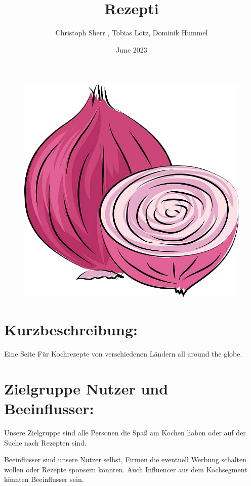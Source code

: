 \documentclass{article}
\title{Rezepti}
\author{ Christoph Sherr , Tobias Lotz, Dominik Hummel }
\date{June 2023}
\begin{document}
\begin{figure}
    \centering
    \includegraphics[scale=0.3]{Pictures/rezepti.png}
    \label{fig:sfig1}
\end{figure}
\maketitle

\pagebreak
\section{Kurzbeschreibung:}
Eine Seite Für Kochrezepte von verschiedenen Ländern all around the globe.

\section{Zielgruppe Nutzer und Beeinflusser:}
Unsere Zielgruppe sind alle Personen die Spaß am Kochen haben oder auf der Suche nach Rezepten sind.

Beeinflusser sind unsere Nutzer selbst, Firmen die eventuell Werbung schalten wollen oder Rezepte 
sponsern könnten. Auch Influencer aus dem Kochsegment könnten Beeinflusser sein.
\end{document}
